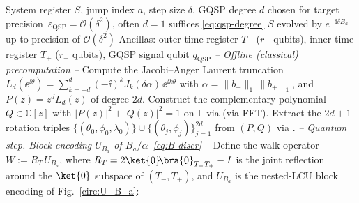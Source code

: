 \setcounter{algorithm}{0}
\renewcommand{\thealgorithm}{\arabic{algorithm}a}
\begin{algorithm}[!htbp]
\caption{\textsc{CoherentStep}: Hamiltonian simulation of
         $e^{-\mathrm{i}\delta B_a}$ via block encoding and GQSP}
\label{alg:coh}
\begin{algorithmic}[1]
\small
\Require System register $S$, jump index $a$, step size $\delta$,
         GQSP degree $d$ chosen for target precision~$\varepsilon_\mathrm{QSP} = \mathcal{O}(\delta^2)$, often $d = 1$ suffices
         \eqref{eq:qsp-degree}
\Ensure  $S$ evolved by $e^{-\mathrm{i}\delta B_a}$ up to precision of $\mathcal{O}(\delta^2)$
\Statex
\State Ancillas:
  outer time register $T_-$ ($r_-$ qubits),
  inner time register $T_+$ ($r_+$ qubits),
  GQSP signal qubit $q_{\mathrm{QSP}}$
\Statex
\Statex \textit{-- Offline (classical) precomputation --}
\State Compute the Jacobi--Anger Laurent truncation
  $L_d(\ee^{\ii\theta}) = \sum_{k=-d}^{d}(-\ii)^k J_k(\delta\alpha)\,\ee^{\ii k\theta}$
  with $\alpha = \lVert b_-\rVert_1\,\lVert b_+\rVert_1$, and $P(z) = z^d L_d(z)$ of degree $2d$. Construct the complementary polynomial $Q\in\mathbb{C}[z]$
  with $|P(z)|^2 + |Q(z)|^2 = 1$ on $\mathbb{T}$ via
  \cite[Alg.~1]{berntson2025complementary} (via FFT).
  Extract the $2d{+}1$ rotation triples $\{(\theta_0,\phi_0,\lambda_0)\}\cup\{(\theta_j,\phi_j)\}_{j=1}^{2d}$ from $(P,Q)$ via \cite[Alg.~1]{motlagh2024generalized}.
\Statex
\Statex \textit{-- Quantum step. Block encoding $U_{B_a}$ of
  $B_a/\alpha$~\eqref{eq:B-discr} --}
\State Define the walk operator
  $W := R_T\,U_{B_a}$, where
  $R_T = 2\ket{0}\!\bra{0}_{T_-T_+} - I$
  is the joint reflection around the $\ket{0}$ subspace of $(T_-, T_+)$,
  and $U_{B_a}$ is the nested-LCU block encoding of
  Fig.~\ref{circ:U_B_a}:
\end{algorithmic}
\end{algorithm}
